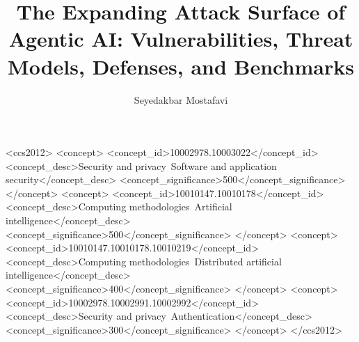 \documentclass[acmsmall,screen,nonacm]{acmart}
\begin{document}
\title{The Expanding Attack Surface of Agentic AI: Vulnerabilities, Threat Models, Defenses, and Benchmarks}

\author{Seyedakbar Mostafavi}



\begin{CCSXML}
<ccs2012>
   <concept>
       <concept_id>10002978.10003022</concept_id>
       <concept_desc>Security and privacy~Software and application security</concept_desc>
       <concept_significance>500</concept_significance>
   </concept>
   <concept>
       <concept_id>10010147.10010178</concept_id>
       <concept_desc>Computing methodologies~Artificial intelligence</concept_desc>
       <concept_significance>500</concept_significance>
   </concept>
   <concept>
       <concept_id>10010147.10010178.10010219</concept_id>
       <concept_desc>Computing methodologies~Distributed artificial intelligence</concept_desc>
       <concept_significance>400</concept_significance>
   </concept>
   <concept>
       <concept_id>10002978.10002991.10002992</concept_id>
       <concept_desc>Security and privacy~Authentication</concept_desc>
       <concept_significance>300</concept_significance>
   </concept>
</ccs2012>
\end{CCSXML}



\maketitle















\end{document}
